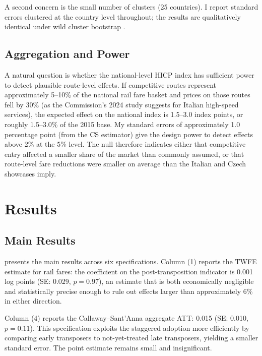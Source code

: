 \documentclass[12pt]{article}
\begin{document}
A second concern is the small number of clusters (25 countries). I report standard errors clustered at the country level throughout; the results are qualitatively identical under wild cluster bootstrap \citep{cameron2008bootstrap}.

\subsection{Aggregation and Power}

A natural question is whether the national-level HICP index has sufficient power to detect plausible route-level effects. If competitive routes represent approximately 5--10\% of the national rail fare basket and prices on those routes fell by 30\% (as the Commission's 2024 study suggests for Italian high-speed services), the expected effect on the national index is 1.5--3.0 index points, or roughly 1.5--3.0\% of the 2015 base. My standard errors of approximately 1.0 percentage point (from the CS estimator) give the design power to detect effects above 2\% at the 5\% level. The null therefore indicates either that competitive entry affected a smaller share of the market than commonly assumed, or that route-level fare reductions were smaller on average than the Italian and Czech showcases imply.


\section{Results}

\subsection{Main Results}



 presents the main results across six specifications. Column (1) reports the TWFE estimate for rail fares: the coefficient on the post-transposition indicator is 0.001 log points (SE: 0.029, $p = 0.97$), an estimate that is both economically negligible and statistically precise enough to rule out effects larger than approximately 6\% in either direction.

Column (4) reports the Callaway--Sant'Anna aggregate ATT: 0.015 (SE: 0.010, $p = 0.11$). This specification exploits the staggered adoption more efficiently by comparing early transposers to not-yet-treated late transposers, yielding a smaller standard error. The point estimate remains small and insignificant.
\end{document}
